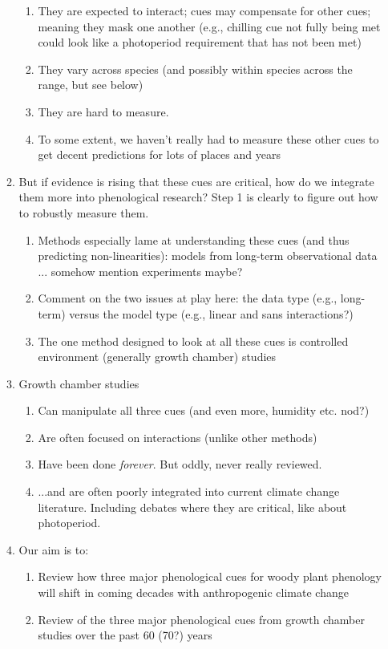 \documentclass[11pt,letterpaper]{article}
\begin{document}
\begin{enumerate}
\begin{enumerate}
\begin{enumerate}
\item They are expected to interact; cues may compensate for other cues; meaning they mask one another (e.g., chilling cue not fully being met could look like a photoperiod requirement that has not been met)
\item They vary across species (and possibly within species across the range, but see below)
\item They are hard to measure.
\item To some extent, we haven't really had to measure these other cues to get decent predictions for lots of places and years
\end{enumerate}
\item But if evidence is rising that these cues are critical, how do we integrate them more into phenological research? Step 1 is clearly to figure out how to robustly measure them. 
\begin{enumerate}
\item Methods especially lame at understanding these cues (and thus predicting non-linearities): models from long-term observational data ... somehow mention experiments maybe?
\item Comment on the two issues at play here: the data type (e.g., long-term) versus the model type (e.g., linear and sans interactions?)
\item The one method designed to look at all these cues is controlled environment (generally growth chamber) studies
\end{enumerate}
\item Growth chamber studies
\begin{enumerate}
\item Can manipulate all three cues (and even more, humidity etc. nod?)
\item Are often focused on interactions (unlike other methods)
\item Have been done \emph{forever}. But oddly, never really reviewed.
\item  ...and are often poorly integrated into current climate change literature. Including debates where they are critical, like about photoperiod. 
\end{enumerate}
\item Our aim is to:
\begin{enumerate}
\item Review how three major phenological cues for woody plant phenology will shift in coming decades with anthropogenic climate change
\item Review of the three major phenological cues from growth chamber studies over the past 60 (70?) years

\end{enumerate}
\end{enumerate}
\end{enumerate}
\end{document}

